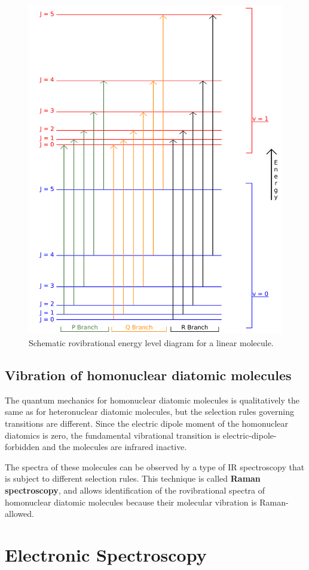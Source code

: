 \documentclass[
  9pt,
]{extbook}
\theoremstyle{definition}
\theoremstyle{definition}
\theoremstyle{definition}
\theoremstyle{remark}
\begin{document}
\begin{figure}

{\centering \includegraphics[width=0.5\linewidth]{./img/OEP_wiki7} 

}

\caption{Schematic rovibrational energy level diagram for a linear molecule.}\label{fig:Fig3c13}
\end{figure}

\hypertarget{vibration-of-homonuclear-diatomic-molecules}{%
\subsection{Vibration of homonuclear diatomic molecules}\label{vibration-of-homonuclear-diatomic-molecules}}

The quantum mechanics for homonuclear diatomic molecules is qualitatively the same as for heteronuclear diatomic molecules, but the selection rules governing transitions are different. Since the electric dipole moment of the homonuclear diatomics is zero, the fundamental vibrational transition is electric-dipole-forbidden and the molecules are infrared inactive.

The spectra of these molecules can be observed by a type of IR spectroscopy that is subject to different selection rules. This technique is called \textbf{Raman spectroscopy}, and allows identification of the rovibrational spectra of homonuclear diatomic molecules because their molecular vibration is Raman-allowed.

\hypertarget{electronic-spectroscopy}{%
\section{Electronic Spectroscopy}\label{electronic-spectroscopy}}
\end{document}
